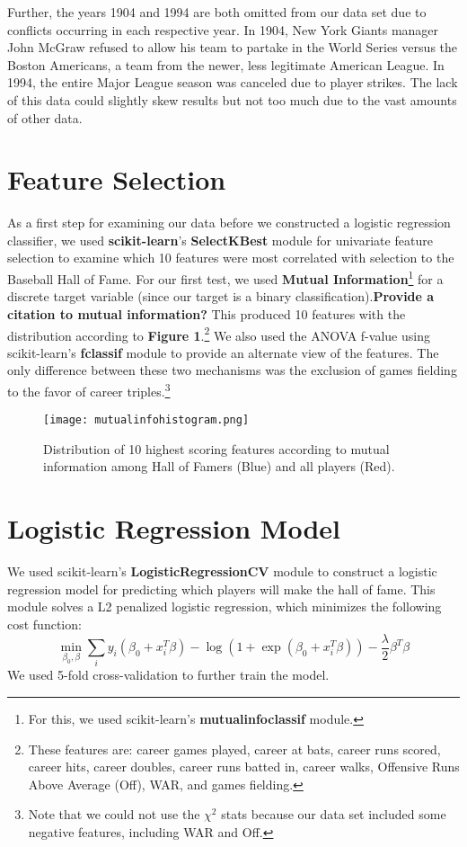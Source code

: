 \documentclass{sigkddExp}
\begin{document}
Further, the years 1904 and 1994 are both omitted from our data set due to conflicts occurring in each respective year. In 1904, New York Giants manager John McGraw refused to allow his team to partake in the World Series versus the Boston Americans, a team from the newer, less legitimate American League. In 1994, the entire Major League season was canceled due to player strikes. The lack of this data could slightly skew results but not too much due to the vast amounts of other data.

\section{Feature Selection}
As a first step for examining our data before we constructed a logistic regression classifier, we used \textbf{scikit-learn}'s \textbf{SelectKBest} module for univariate feature selection to examine which 10 features were most correlated with selection to the Baseball Hall of Fame. For our first test, we used \textbf{Mutual Information}\footnote{For this, we used scikit-learn's \textbf{mutual\textunderscore info\textunderscore classif} module.} for a discrete target variable (since our target is a binary classification).\textbf{Provide a citation to mutual information?} This produced 10 features with the distribution according to \textbf{Figure 1}.\footnote{These features are: career games played, career at bats, career runs scored, career hits, career doubles, career runs batted in, career walks, Offensive Runs Above Average (Off), WAR, and games fielding.} We also used the ANOVA f-value using scikit-learn's \textbf{f\textunderscore classif} module to provide an alternate view of the features. The only difference between these two mechanisms was the exclusion of games fielding to the favor of career triples.\footnote{Note that we could not use the $\chi^2$ stats because our data set included some negative features, including WAR and Off.}

\begin{figure}[htbp]
\texttt{[image: mutualinfohistogram.png]} 
\caption{Distribution of 10 highest scoring features according to mutual information among Hall of Famers (Blue) and all players (Red).}
\end{figure} 

\section{Logistic Regression Model}
We used scikit-learn's \textbf{LogisticRegressionCV} module to construct a logistic regression model for predicting which players will make the hall of fame. This module solves a L2 penalized logistic regression, which minimizes the following cost function: $$ \min_{\beta_0,\beta} \sum_i y_i(\beta_0+x_i^T\beta)-\log(1+\exp{(\beta_0+x_i^T\beta)}) - \frac{\lambda}{2}\beta^T\beta $$
We used 5-fold cross-validation to further train the model. 
\end{document}
